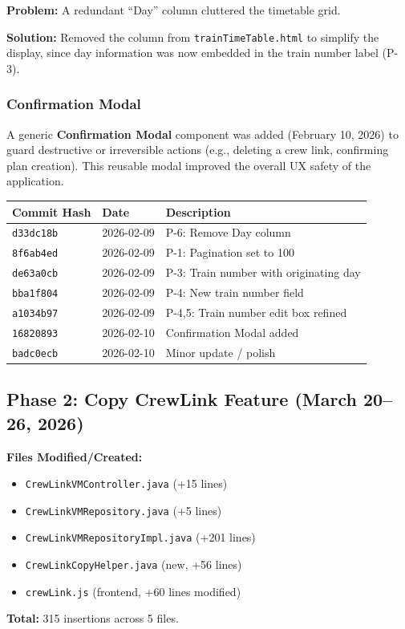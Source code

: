 \documentclass[12pt,a4paper]{article}
\begin{document}
\textbf{Problem:} A redundant ``Day'' column cluttered the timetable grid.

\textbf{Solution:} Removed the column from \texttt{trainTimeTable.html} to
simplify the display, since day information was now embedded in the train
number label (P-3).

\subsubsection{Confirmation Modal}

A generic \textbf{Confirmation Modal} component was added (February 10, 2026)
to guard destructive or irreversible actions (e.g., deleting a crew link,
confirming plan creation). This reusable modal improved the overall UX safety
of the application.

\medskip
\begin{tabular}{@{} L{2.6cm} L{2.6cm} L{8cm} @{}}
\toprule
\textbf{Commit Hash} & \textbf{Date} & \textbf{Description} \\
\midrule
\texttt{d33dc18b} & 2026-02-09 & P-6: Remove Day column \\
\texttt{8f6ab4ed} & 2026-02-09 & P-1: Pagination set to 100 \\
\texttt{de63a0cb} & 2026-02-09 & P-3: Train number with originating day \\
\texttt{bba1f804} & 2026-02-09 & P-4: New train number field \\
\texttt{a1034b97} & 2026-02-09 & P-4,5: Train number edit box refined \\
\texttt{16820893} & 2026-02-10 & Confirmation Modal added \\
\texttt{badc0ecb} & 2026-02-10 & Minor update / polish \\
\bottomrule
\end{tabular}


\subsection{Phase 2: Copy CrewLink Feature (March 20--26, 2026)}

\textbf{Files Modified/Created:}
\begin{itemize}[leftmargin=1.5em]
    \item \texttt{CrewLinkVMController.java} (+15 lines)
    \item \texttt{CrewLinkVMRepository.java} (+5 lines)
    \item \texttt{CrewLinkVMRepositoryImpl.java} (+201 lines)
    \item \texttt{CrewLinkCopyHelper.java} (new, +56 lines)
    \item \texttt{crewLink.js} (frontend, +60 lines modified)
\end{itemize}
\textbf{Total:} 315 insertions across 5 files.
\end{document}
